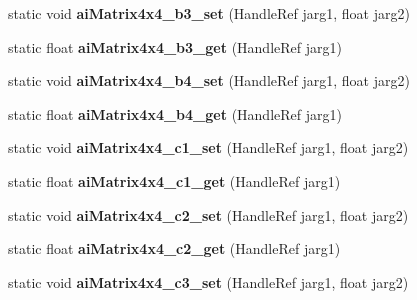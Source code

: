 \begin{DoxyCompactItemize}
\item 
\hypertarget{class_assimp_p_i_n_v_o_k_e_a24628df71d6f1151223f0105c2f7cc26}{static void {\bfseries ai\+Matrix4x4\+\_\+b3\+\_\+set} (Handle\+Ref jarg1, float jarg2)}\label{class_assimp_p_i_n_v_o_k_e_a24628df71d6f1151223f0105c2f7cc26}

\item 
\hypertarget{class_assimp_p_i_n_v_o_k_e_a02d06d66fc7d8e326aab46cd1124a588}{static float {\bfseries ai\+Matrix4x4\+\_\+b3\+\_\+get} (Handle\+Ref jarg1)}\label{class_assimp_p_i_n_v_o_k_e_a02d06d66fc7d8e326aab46cd1124a588}

\item 
\hypertarget{class_assimp_p_i_n_v_o_k_e_a89a40d8c0b1a0d36795491e1aee72b87}{static void {\bfseries ai\+Matrix4x4\+\_\+b4\+\_\+set} (Handle\+Ref jarg1, float jarg2)}\label{class_assimp_p_i_n_v_o_k_e_a89a40d8c0b1a0d36795491e1aee72b87}

\item 
\hypertarget{class_assimp_p_i_n_v_o_k_e_ae41ae64103eb3abb5d1d6a776f23a519}{static float {\bfseries ai\+Matrix4x4\+\_\+b4\+\_\+get} (Handle\+Ref jarg1)}\label{class_assimp_p_i_n_v_o_k_e_ae41ae64103eb3abb5d1d6a776f23a519}

\item 
\hypertarget{class_assimp_p_i_n_v_o_k_e_a5b4cd5e14b2e433ee32d2268d335773b}{static void {\bfseries ai\+Matrix4x4\+\_\+c1\+\_\+set} (Handle\+Ref jarg1, float jarg2)}\label{class_assimp_p_i_n_v_o_k_e_a5b4cd5e14b2e433ee32d2268d335773b}

\item 
\hypertarget{class_assimp_p_i_n_v_o_k_e_a8494b26380052469c522140077447191}{static float {\bfseries ai\+Matrix4x4\+\_\+c1\+\_\+get} (Handle\+Ref jarg1)}\label{class_assimp_p_i_n_v_o_k_e_a8494b26380052469c522140077447191}

\item 
\hypertarget{class_assimp_p_i_n_v_o_k_e_abe218e0899d76e453072b1cb7a51d4c3}{static void {\bfseries ai\+Matrix4x4\+\_\+c2\+\_\+set} (Handle\+Ref jarg1, float jarg2)}\label{class_assimp_p_i_n_v_o_k_e_abe218e0899d76e453072b1cb7a51d4c3}

\item 
\hypertarget{class_assimp_p_i_n_v_o_k_e_a8004fcac299de5cafb1fb7509ecb02a9}{static float {\bfseries ai\+Matrix4x4\+\_\+c2\+\_\+get} (Handle\+Ref jarg1)}\label{class_assimp_p_i_n_v_o_k_e_a8004fcac299de5cafb1fb7509ecb02a9}

\item 
\hypertarget{class_assimp_p_i_n_v_o_k_e_a943e40093d334e9bbffd2a6b2f614bbd}{static void {\bfseries ai\+Matrix4x4\+\_\+c3\+\_\+set} (Handle\+Ref jarg1, float jarg2)}\label{class_assimp_p_i_n_v_o_k_e_a943e40093d334e9bbffd2a6b2f614bbd}


\end{DoxyCompactItemize}
